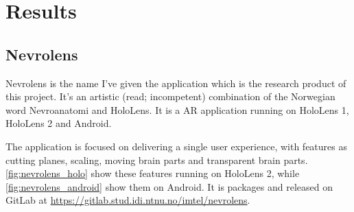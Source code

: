 


\chapter{Results}


\section{Nevrolens}\label{nevrolens}
Nevrolens is the name I've given the application which is the research product of this project. It's an artistic (read; incompetent) combination of the Norwegian word Nevroanatomi and HoloLens. It is a AR application running on HoloLens 1, HoloLens 2 and Android. 

The application is focused on delivering a single user experience, with features as cutting planes, scaling, moving brain parts and transparent brain parts. \autoref{fig:nevrolens_holo} show these features running on HoloLens 2, while \autoref{fig:nevrolens_android} show them on Android.
It is packages and released on GitLab at \url{https://gitlab.stud.idi.ntnu.no/imtel/nevrolens}. 


